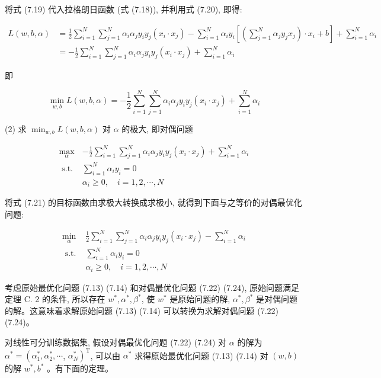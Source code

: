 \documentclass[10pt]{article}
\begin{document}
将式 (7.19) 代入拉格朗日函数 (式 (7.18)), 并利用式 (7.20), 即得:

$$
\begin{aligned}
L(w, b, \alpha) & =\frac{1}{2} \sum_{i=1}^{N} \sum_{j=1}^{N} \alpha_{i} \alpha_{j} y_{i} y_{j}\left(x_{i} \cdot x_{j}\right)-\sum_{i=1}^{N} \alpha_{i} y_{i}\left[\left(\sum_{j=1}^{N} \alpha_{j} y_{j} x_{j}\right) \cdot x_{i}+b\right]+\sum_{i=1}^{N} \alpha_{i} \\
& =-\frac{1}{2} \sum_{i=1}^{N} \sum_{j=1}^{N} \alpha_{i} \alpha_{j} y_{i} y_{j}\left(x_{i} \cdot x_{j}\right)+\sum_{i=1}^{N} \alpha_{i}
\end{aligned}
$$

即

$$
\min _{w, b} L(w, b, \alpha)=-\frac{1}{2} \sum_{i=1}^{N} \sum_{j=1}^{N} \alpha_{i} \alpha_{j} y_{i} y_{j}\left(x_{i} \cdot x_{j}\right)+\sum_{i=1}^{N} \alpha_{i}
$$

(2) 求 $\min _{w, b} L(w, b, \alpha)$ 对 $\alpha$ 的极大, 即对偶问题

\[
\begin{array}{ll}
\max _{\alpha} & -\frac{1}{2} \sum_{i=1}^{N} \sum_{j=1}^{N} \alpha_{i} \alpha_{j} y_{i} y_{j}\left(x_{i} \cdot x_{j}\right)+\sum_{i=1}^{N} \alpha_{i}  \tag{7.21}\\
\text { s.t. } & \sum_{i=1}^{N} \alpha_{i} y_{i}=0 \\
& \alpha_{i} \geqslant 0, \quad i=1,2, \cdots, N
\end{array}
\]

将式 (7.21) 的目标函数由求极大转换成求极小, 就得到下面与之等价的对偶最优化问题:

\[
\begin{array}{ll}
\min _{\alpha} & \frac{1}{2} \sum_{i=1}^{N} \sum_{j=1}^{N} \alpha_{i} \alpha_{j} y_{i} y_{j}\left(x_{i} \cdot x_{j}\right)-\sum_{i=1}^{N} \alpha_{i} \\
\text { s.t. } & \sum_{i=1}^{N} \alpha_{i} y_{i}=0 \\
& \alpha_{i} \geqslant 0, \quad i=1,2, \cdots, N \tag{7.24}
\end{array}
\]

考虑原始最优化问题 (7.13) (7.14) 和对偶最优化问题 (7.22) (7.24), 原始问题满足定理 C. 2 的条件, 所以存在 $w^{*}, \alpha^{*}, \beta^{*}$, 使 $w^{*}$ 是原始问题的解, $\alpha^{*}, \beta^{*}$ 是对偶问题的解。这意味着求解原始问题 (7.13) (7.14) 可以转换为求解对偶问题 (7.22) (7.24)。

对线性可分训练数据集, 假设对偶最优化问题 (7.22) (7.24) 对 $\alpha$ 的解为 $\alpha^{*}=\left(\alpha_{1}^{*}, \alpha_{2}^{*}, \cdots\right.$, $\left.\alpha_{N}^{*}\right)^{\mathrm{T}}$, 可以由 $\alpha^{*}$ 求得原始最优化问题 (7.13) (7.14) 对 $(w, b)$ 的解 $w^{*}, b^{*}$ 。有下面的定理。
\end{document}
